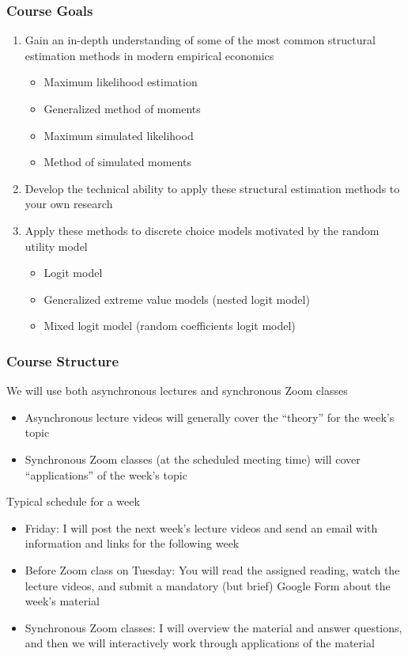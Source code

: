 \documentclass{beamer}
\begin{document}
\begin{frame}\frametitle{Course Goals}
    \begin{enumerate}
        \item Gain an in-depth understanding of some of the most common structural estimation methods in modern empirical economics
        \begin{itemize}
            \item Maximum likelihood estimation
            \item Generalized method of moments
            \item Maximum simulated likelihood
            \item Method of simulated moments
        \end{itemize}
        \vspace{2ex} 
        \item Develop the technical ability to apply these structural estimation methods to your own research
        \vspace{2ex}
        \item Apply these methods to discrete choice models motivated by the random utility model
        \begin{itemize}
            \item Logit model
            \item Generalized extreme value models (nested logit model)
            \item Mixed logit model (random coefficients logit model)
        \end{itemize}
    \end{enumerate}
\end{frame}

\begin{frame}\frametitle{Course Structure}
    We will use both asynchronous lectures and synchronous Zoom classes
    \begin{itemize}
        \item Asynchronous lecture videos will generally cover the ``theory'' for the week's topic
        \item Synchronous Zoom classes (at the scheduled meeting time) will cover ``applications'' of the week's topic
    \end{itemize}
    \vspace{2ex}
    Typical schedule for a week
    \begin{itemize}
        \item Friday: I will post the next week's lecture videos and send an email with information and links for the following week
        \item Before Zoom class on Tuesday: You will read the assigned reading, watch the lecture videos, and submit a mandatory (but brief) Google Form about the week's material
        \item Synchronous Zoom classes: I will overview the material and answer questions, and then we will interactively work through applications of the material
    \end{itemize}


\end{frame}
\end{document}
